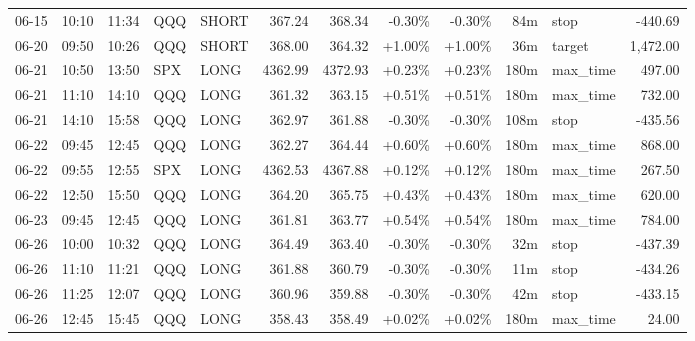 \documentclass[11pt,a4paper,twoside]{article}
\begin{document}
\begin{center}
\begin{longtable}{>{\color{txtmain}}l l l l l r r r r r >{\color{txtmain}}l r}
06-15 & 10:10 & 11:34 & QQQ & SHORT & 367.24 & 368.34 & \textcolor{lossred}{-0.30\%} & \textcolor{lossred}{-0.30\%} & 84m & stop & \textcolor{lossred}{-440.69} \\
06-20 & 09:50 & 10:26 & QQQ & SHORT & 368.00 & 364.32 & \textcolor{wingreen}{+1.00\%} & \textcolor{wingreen}{+1.00\%} & 36m & target & \textcolor{wingreen}{1,472.00} \\
06-21 & 10:50 & 13:50 & SPX & LONG & 4362.99 & 4372.93 & \textcolor{wingreen}{+0.23\%} & \textcolor{wingreen}{+0.23\%} & 180m & max\_time & \textcolor{wingreen}{497.00} \\
06-21 & 11:10 & 14:10 & QQQ & LONG & 361.32 & 363.15 & \textcolor{wingreen}{+0.51\%} & \textcolor{wingreen}{+0.51\%} & 180m & max\_time & \textcolor{wingreen}{732.00} \\
06-21 & 14:10 & 15:58 & QQQ & LONG & 362.97 & 361.88 & \textcolor{lossred}{-0.30\%} & \textcolor{lossred}{-0.30\%} & 108m & stop & \textcolor{lossred}{-435.56} \\
06-22 & 09:45 & 12:45 & QQQ & LONG & 362.27 & 364.44 & \textcolor{wingreen}{+0.60\%} & \textcolor{wingreen}{+0.60\%} & 180m & max\_time & \textcolor{wingreen}{868.00} \\
06-22 & 09:55 & 12:55 & SPX & LONG & 4362.53 & 4367.88 & \textcolor{wingreen}{+0.12\%} & \textcolor{wingreen}{+0.12\%} & 180m & max\_time & \textcolor{wingreen}{267.50} \\
06-22 & 12:50 & 15:50 & QQQ & LONG & 364.20 & 365.75 & \textcolor{wingreen}{+0.43\%} & \textcolor{wingreen}{+0.43\%} & 180m & max\_time & \textcolor{wingreen}{620.00} \\
06-23 & 09:45 & 12:45 & QQQ & LONG & 361.81 & 363.77 & \textcolor{wingreen}{+0.54\%} & \textcolor{wingreen}{+0.54\%} & 180m & max\_time & \textcolor{wingreen}{784.00} \\
06-26 & 10:00 & 10:32 & QQQ & LONG & 364.49 & 363.40 & \textcolor{lossred}{-0.30\%} & \textcolor{lossred}{-0.30\%} & 32m & stop & \textcolor{lossred}{-437.39} \\
06-26 & 11:10 & 11:21 & QQQ & LONG & 361.88 & 360.79 & \textcolor{lossred}{-0.30\%} & \textcolor{lossred}{-0.30\%} & 11m & stop & \textcolor{lossred}{-434.26} \\
06-26 & 11:25 & 12:07 & QQQ & LONG & 360.96 & 359.88 & \textcolor{lossred}{-0.30\%} & \textcolor{lossred}{-0.30\%} & 42m & stop & \textcolor{lossred}{-433.15} \\
06-26 & 12:45 & 15:45 & QQQ & LONG & 358.43 & 358.49 & \textcolor{wingreen}{+0.02\%} & \textcolor{wingreen}{+0.02\%} & 180m & max\_time & \textcolor{wingreen}{24.00} \\

\end{longtable}
\end{center}
\end{document}
